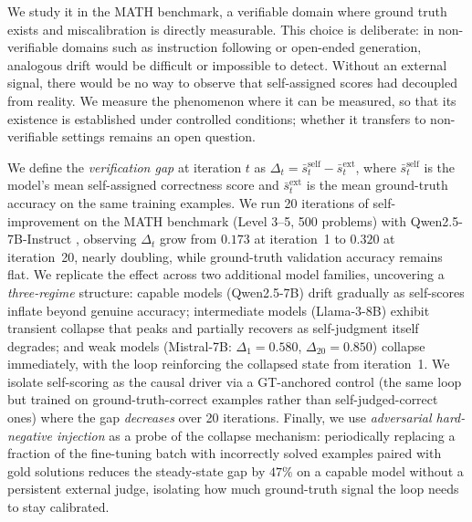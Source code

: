 \documentclass{article}
\begin{document}
We study it in the MATH benchmark, a verifiable domain where ground truth
exists and miscalibration is directly measurable.
This choice is deliberate: in non-verifiable domains such as instruction
following or open-ended generation, analogous drift would be difficult or
impossible to detect.
Without an external signal, there would be no way to observe that self-assigned
scores had decoupled from reality.
We measure the phenomenon where it can be measured, so that its existence
is established under controlled conditions; whether it transfers to
non-verifiable settings remains an open question.

We define the \emph{verification gap} at iteration $t$ as
$\Delta_t = \bar{s}_t^{\text{self}} - \bar{s}_t^{\text{ext}}$,
where $\bar{s}_t^{\text{self}}$ is the model's mean self-assigned correctness
score and $\bar{s}_t^{\text{ext}}$ is the mean ground-truth accuracy on the
same training examples.
We run 20 iterations of self-improvement on the MATH benchmark (Level 3--5,
500 problems) with Qwen2.5-7B-Instruct \citep{qwen2025}, observing
$\Delta_t$ grow from $0.173$ at iteration~1 to $0.320$ at iteration~20,
nearly doubling, while ground-truth validation accuracy remains flat.
We replicate the effect across two additional model families, uncovering a
\emph{three-regime} structure: capable models (Qwen2.5-7B) drift gradually
as self-scores inflate beyond genuine accuracy; intermediate models
(Llama-3-8B) exhibit transient collapse that peaks and partially recovers
as self-judgment itself degrades; and weak models
(Mistral-7B: $\Delta_1 = 0.580$, $\Delta_{20} = 0.850$) collapse
immediately, with the loop reinforcing the collapsed state from iteration~1.
We isolate self-scoring as the causal driver via a GT-anchored control (the
same loop but trained on ground-truth-correct examples rather than
self-judged-correct ones) where the gap \emph{decreases} over 20 iterations.
Finally, we use \emph{adversarial hard-negative injection} as a probe of the
collapse mechanism: periodically replacing a fraction of the fine-tuning batch
with incorrectly solved examples paired with gold solutions reduces the
steady-state gap by $47\%$ on a capable model without a persistent external
judge, isolating how much ground-truth signal the loop needs to stay calibrated.
\end{document}
